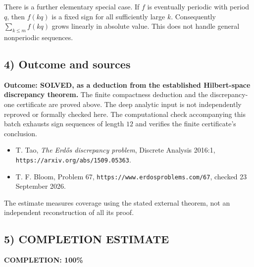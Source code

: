 There is a further elementary special case. If $f$ is eventually
periodic with period $q$, then $f(kq)$ is a fixed sign for all sufficiently
large $k$. Consequently $\sum_{k\leq m}f(kq)$ grows linearly in
absolute value. This does not handle general nonperiodic sequences.

\subsection{4) Outcome and sources}
\textbf{Outcome: SOLVED, as a deduction from the established
Hilbert-space discrepancy theorem.} The finite compactness deduction
and the discrepancy-one certificate are proved above. The deep
analytic input is not independently reproved or formally checked here.
The computational check accompanying this batch exhausts sign
sequences of length $12$ and verifies the finite certificate's conclusion.

\begin{itemize}
\item T. Tao, \emph{The Erd\H{o}s discrepancy problem}, Discrete
Analysis 2016:1, \texttt{https://arxiv.org/abs/1509.05363}.
\item T. F. Bloom, Problem 67,
\texttt{https://www.erdosproblems.com/67}, checked 23 September 2026.
\end{itemize}
The estimate measures coverage using the stated external theorem,
not an independent reconstruction of all its proof.
\subsection{5) COMPLETION ESTIMATE}
\textbf{COMPLETION: 100\%}
